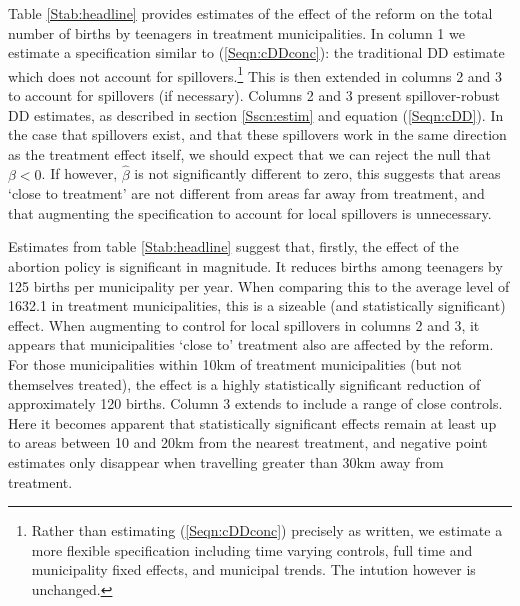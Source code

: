 Table \ref{Stab:headline} provides estimates of the effect of the reform on
the total number of births by teenagers in treatment municipalities.  In 
column 1 we estimate a specification similar to (\ref{Seqn:cDDconc}): the 
traditional DD estimate which does not account for spillovers.\footnote{Rather 
than estimating (\ref{Seqn:cDDconc}) precisely as written, we estimate a more 
flexible specification including time varying controls, full time and
municipality fixed effects, and municipal trends.  The intution however is
unchanged.}  This is then extended in columns 2 and 3 to account for spillovers
(if necessary).  Columns 2 and 3 present spillover-robust DD estimates, as 
described in section \ref{Sscn:estim} and equation (\ref{Seqn:cDD}).  In the
case that spillovers exist, and that these spillovers work in the same 
direction as the treatment effect itself, we should expect that we can reject
the null that $\beta<0$.  If however, $\hat\beta$ is not significantly 
different to zero, this suggests that areas `close to treatment' are not
different from areas far away from treatment, and that augmenting the 
specification to account for local spillovers is unnecessary.



Estimates from table \ref{Stab:headline} suggest that, firstly, the effect of
the abortion policy is significant in magnitude.  It reduces births among 
teenagers by 125 births per municipality per year. When comparing this to the
average level of 1632.1 in treatment municipalities, this is a sizeable (and
statistically significant) effect.  When augmenting to control for local
spillovers in columns 2 and 3, it appears that municipalities `close to' 
treatment also are affected by the reform.  For those municipalities within
10km of treatment municipalities (but not themselves treated), the effect is 
a highly statistically significant reduction of approximately 120 births.
Column 3 extends to include a range of close controls.  Here it becomes
apparent that statistically significant effects remain at least up to areas
between 10 and 20km from the nearest treatment, and negative point estimates
only disappear when travelling greater than 30km away from treatment.

